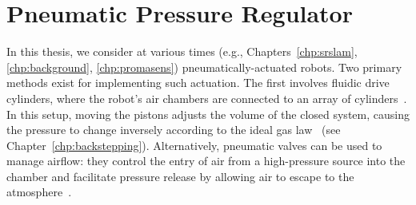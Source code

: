 \section{Pneumatic Pressure Regulator}
In this thesis, we consider at various times (e.g., Chapters~\ref{chp:srslam}, \ref{chp:background}, \ref{chp:promasens}) pneumatically-actuated robots. Two primary methods exist for implementing such actuation. The first involves fluidic drive cylinders, where the robot’s air chambers are connected to an array of cylinders~\citep{marchese2014design, taheri2014force}. In this setup, moving the pistons adjusts the volume of the closed system, causing the pressure to change inversely according to the ideal gas law~\citep{stolzle2021piston} (see Chapter~\ref{chp:backstepping}). Alternatively, pneumatic valves can be used to manage airflow: they control the entry of air from a high-pressure source into the chamber and facilitate pressure release by allowing air to escape to the atmosphere~\citep{falkenhahn2016dynamic}.

